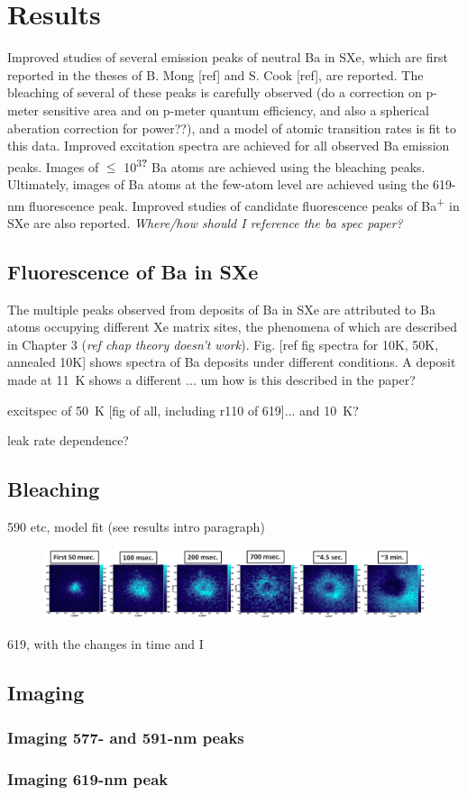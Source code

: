 \chapter{Results}

Improved studies of several emission peaks of neutral Ba in SXe, which are first reported in the theses of B. Mong [ref] and S. Cook [ref], are reported.  The bleaching of several of these peaks is carefully observed ({\color{red}do a correction on p-meter sensitive area and on p-meter quantum efficiency, and also a spherical aberation correction for power??}), and a model of atomic transition rates is fit to this data.  Improved excitation spectra are achieved for all observed Ba emission peaks.  Images of $\leq$ 10\textsuperscript{3\textbf{?}} Ba atoms are achieved using the bleaching peaks.  Ultimately, images of Ba atoms at the few-atom level are achieved using the 619-nm fluorescence peak.  Improved studies of candidate fluorescence peaks of Ba\textsuperscript{+} in SXe are also reported.  {\color{red}\emph{Where/how should I reference the ba spec paper?}}

\section{Fluorescence of Ba in SXe}

The multiple peaks observed from deposits of Ba in SXe are attributed to Ba atoms occupying different Xe matrix sites, the phenomena of which are described in Chapter 3 {\color{red}(\emph{ref chap theory doesn't work})}.  Fig. [ref fig spectra for 10K, 50K, annealed 10K] shows spectra of Ba deposits under different conditions.  A deposit made at 11~K shows a different ... um how is this described in the paper?

excitspec of 50~K [fig of all, including r110 of 619]... and 10~K?

leak rate dependence?

\section{Bleaching}

590 etc, model fit (see results intro paragraph)

\begin{figure}[H]
        \centering
                \includegraphics[width=.9\textwidth]{figures/hole_bleach_590.png}
                \caption{}
\label{fig:testfig}
\end{figure}

619, with the changes in time and I

\section{Imaging}

\subsection{Imaging 577- and 591-nm peaks}

\subsection{Imaging 619-nm peak}
